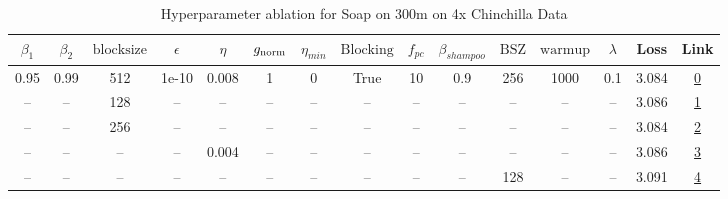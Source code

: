 \begin{table}[H]
\centering
\caption{Hyperparameter ablation for Soap on 300m on 4x Chinchilla Data}
\label{tab:ablation_soap_300m_on_4x_chinchilla_data}
\begin{tabular}{ccccccccccccccc}
\toprule
$\beta_1$ & $\beta_2$ & $\mathrm{block size}$ & $\epsilon$ & $\eta$ & $g_{\mathrm{norm}}$ & $\eta_{min}$ & $\mathrm{Blocking}$ & $f_{pc}$ & $\beta_{shampoo}$ & $\mathrm{BSZ}$ & $\mathrm{warmup}$ & $\lambda$ & Loss & Link \\
\midrule
0.95 & 0.99 & 512 & 1e-10 & 0.008 & 1 & 0 & True & 10 & 0.9 & 256 & 1000 & 0.1 & 3.084 & \href{https://wandb.ai/marin-community/optimizer-scaling/runs/sweep-300m-24B-soapeie4b166lr0.008-wd0.1-minlr0-warmup1000-b10.9-9894a6}{0} \\
\midrule
-- & -- & 128 & -- & -- & -- & -- & -- & -- & -- & -- & -- & -- & 3.086 & \href{https://wandb.ai/marin-community/optimizer-scaling/runs/sweep-300m-24B-soapeib93333lr0.008-wd0.1-minlr0-warmup1000-b10.9-811046}{1} \\
-- & -- & 256 & -- & -- & -- & -- & -- & -- & -- & -- & -- & -- & 3.084 & \href{https://wandb.ai/marin-community/optimizer-scaling/runs/sweep-300m-24B-soapei1f2d4flr0.008-wd0.1-minlr0-warmup1000-b10.9-63b43e}{2} \\
-- & -- & -- & -- & 0.004 & -- & -- & -- & -- & -- & -- & -- & -- & 3.086 & \href{https://wandb.ai/marin-community/optimizer-scaling/runs/sweep-300m-24B-soapei97cdfclr0.004-wd0.1-minlr0-warmup1000-b10.9-97c1bf}{3} \\
-- & -- & -- & -- & -- & -- & -- & -- & -- & -- & 128 & -- & -- & 3.091 & \href{https://wandb.ai/marin-community/optimizer-scaling/runs/sweep-300m-24B-soapeie57080lr0.008-wd0.1-minlr0-warmup1000-b10.9-7a725d}{4} \\
\bottomrule
\end{tabular}
\end{table}

